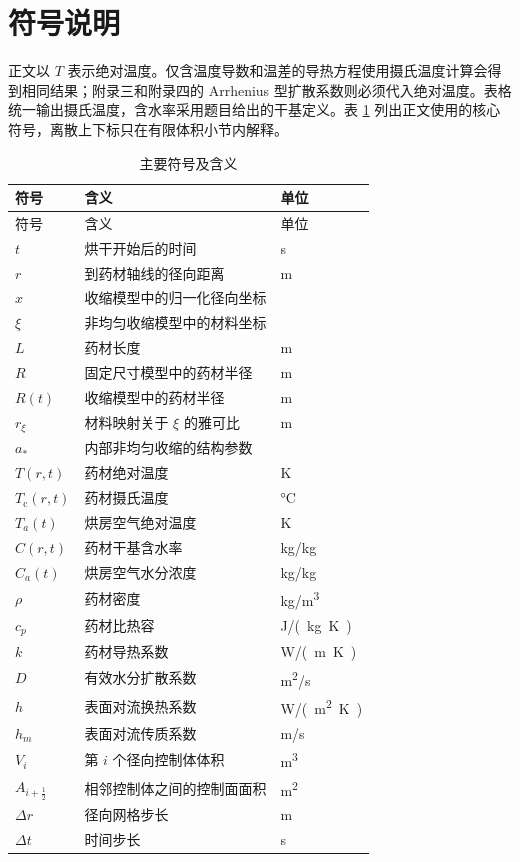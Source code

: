 \documentclass[withoutpreface,bwprint]{cumcmthesis}
\begin{document}
\section{符号说明}

正文以 \(T\) 表示绝对温度。仅含温度导数和温差的导热方程使用摄氏温度计算会得到相同结果；附录三和附录四的 Arrhenius 型扩散系数则必须代入绝对温度。表格统一输出摄氏温度，含水率采用题目给出的干基定义。表 \ref{tab:symbols} 列出正文使用的核心符号，离散上下标只在有限体积小节内解释。

\begin{longtable}{>{\centering\arraybackslash}p{}
                  p{}
                  >{\centering\arraybackslash}p{}}
\caption{主要符号及含义}\label{tab:symbols}\\
\toprule
符号 & 含义 & 单位\\
\midrule
\endfirsthead
\toprule
符号 & 含义 & 单位\\
\midrule
\endhead
\bottomrule
\endfoot
\(t\) & 烘干开始后的时间 & \si{s}\\
\(r\) & 到药材轴线的径向距离 & \si{m}\\
\(x\) & 收缩模型中的归一化径向坐标 & 1\\
\(\xi\) & 非均匀收缩模型中的材料坐标 & 1\\
\(L\) & 药材长度 & \si{m}\\
\(R\) & 固定尺寸模型中的药材半径 & \si{m}\\
\(R(t)\) & 收缩模型中的药材半径 & \si{m}\\
\(r_\xi\) & 材料映射关于 \(\xi\) 的雅可比 & \si{m}\\
\(a_*\) & 内部非均匀收缩的结构参数 & 1\\
\(T(r,t)\) & 药材绝对温度 & \si{K}\\
\(T_{\mathrm{c}}(r,t)\) & 药材摄氏温度 & \si{\degreeCelsius}\\
\(T_a(t)\) & 烘房空气绝对温度 & \si{K}\\
\(C(r,t)\) & 药材干基含水率 & \si{kg/kg}\\
\(C_a(t)\) & 烘房空气水分浓度 & \si{kg/kg}\\
\(\rho\) & 药材密度 & \si{kg/m^3}\\
\(c_p\) & 药材比热容 & \si{J/(kg.K)}\\
\(k\) & 药材导热系数 & \si{W/(m.K)}\\
\(D\) & 有效水分扩散系数 & \si{m^2/s}\\
\(h\) & 表面对流换热系数 & \si{W/(m^2.K)}\\
\(h_m\) & 表面对流传质系数 & \si{m/s}\\
\(V_i\) & 第 \(i\) 个径向控制体体积 & \si{m^3}\\
\(A_{i+\frac12}\) & 相邻控制体之间的控制面面积 & \si{m^2}\\
\(\Delta r\) & 径向网格步长 & \si{m}\\
\(\Delta t\) & 时间步长 & \si{s}\\
\end{longtable}
\end{document}
